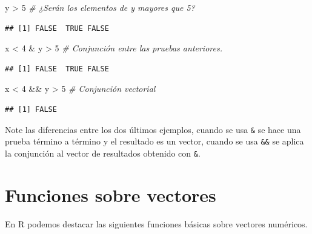 \documentclass[10pt,]{krantz}
\makeatletter
\newenvironment{Shaded}{\begin{snugshade}}{\end{snugshade}}
\newcommand{\DecValTok}[1]{\textcolor[rgb]{0.00,0.00,0.81}{{#1}}}
\newcommand{\StringTok}[1]{\textcolor[rgb]{0.31,0.60,0.02}{{#1}}}
\newcommand{\CommentTok}[1]{\textcolor[rgb]{0.56,0.35,0.01}{\textit{{#1}}}}
\newcommand{\NormalTok}[1]{{#1}}
\let\proglang=\textsf
\newenvironment{kframe}{%
\medskip{}
\setlength{\fboxsep}{.8em}
 \def\at@end@of@kframe{}%
 \ifinner\ifhmode%
  \def\at@end@of@kframe{\end{minipage}}%
  \begin{minipage}{\columnwidth}%
 \fi\fi%
 \def\FrameCommand##1{\hskip\@totalleftmargin \hskip-\fboxsep
 \colorbox{shadecolor}{##1}\hskip-\fboxsep
     \hskip-\linewidth \hskip-\@totalleftmargin \hskip\columnwidth}%
 \MakeFramed {\advance\hsize-\width
   \@totalleftmargin\z@ \linewidth\hsize
   \@setminipage}}%
 {\par\unskip\endMakeFramed%
 \at@end@of@kframe}
\renewenvironment{Shaded}{\begin{kframe}}{\end{kframe}}
\makeatother
\begin{document}
\begin{Shaded}
\begin{Highlighting}[]
\NormalTok{y >}\StringTok{ }\DecValTok{5}  \CommentTok{# ¿Serán los elementos de y mayores que 5?}
\end{Highlighting}
\end{Shaded}

\begin{verbatim}
## [1] FALSE  TRUE FALSE
\end{verbatim}

\begin{Shaded}
\begin{Highlighting}[]
\NormalTok{x <}\StringTok{ }\DecValTok{4} \NormalTok{&}\StringTok{ }\NormalTok{y >}\StringTok{ }\DecValTok{5}  \CommentTok{# Conjunción entre las pruebas anteriores.}
\end{Highlighting}
\end{Shaded}

\begin{verbatim}
## [1] FALSE  TRUE FALSE
\end{verbatim}

\begin{Shaded}
\begin{Highlighting}[]
\NormalTok{x <}\StringTok{ }\DecValTok{4} \NormalTok{&&}\StringTok{ }\NormalTok{y >}\StringTok{ }\DecValTok{5}  \CommentTok{# Conjunción vectorial}
\end{Highlighting}
\end{Shaded}

\begin{verbatim}
## [1] FALSE
\end{verbatim}

Note las diferencias entre los dos últimos ejemplos, cuando se usa
\texttt{\&} se hace una prueba término a término y el resultado es un
vector, cuando se usa \texttt{\&\&} se aplica la conjunción al vector de
resultados obtenido con \texttt{\&}.

\section{Funciones sobre vectores}\label{funciones-sobre-vectores}

En \proglang{R} podemos destacar las siguientes funciones básicas sobre
vectores numéricos.

    
  
\end{document}
